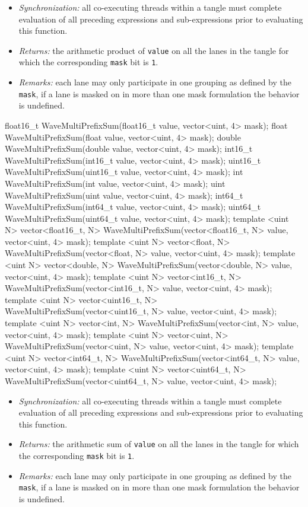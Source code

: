 \begin{itemize}
  \item \textit{Synchronization:} all co-executing threads within a \gls{tangle}
  must complete evaluation of all preceding expressions and sub-expressions
  prior to evaluating this function.
  \item \textit{Returns:} the arithmetic product of \texttt{value} on all the
  \gls{lane}s in the \gls{tangle} for which the corresponding \texttt{mask} bit
  is \texttt{1}.
  \item \textit{Remarks:} each \gls{lane} may only participate in one grouping
  as defined by the \texttt{mask}, if a \gls{lane} is masked on in more than one
  mask formulation the behavior is undefined.
\end{itemize}

\begin{HLSL}
float16_t WaveMultiPrefixSum(float16_t value, vector<uint, 4> mask);
float WaveMultiPrefixSum(float value, vector<uint, 4> mask);
double WaveMultiPrefixSum(double value, vector<uint, 4> mask);
int16_t WaveMultiPrefixSum(int16_t value, vector<uint, 4> mask);
uint16_t WaveMultiPrefixSum(uint16_t value, vector<uint, 4> mask);
int WaveMultiPrefixSum(int value, vector<uint, 4> mask);
uint WaveMultiPrefixSum(uint value, vector<uint, 4> mask);
int64_t WaveMultiPrefixSum(int64_t value, vector<uint, 4> mask);
uint64_t WaveMultiPrefixSum(uint64_t value, vector<uint, 4> mask);
template <uint N>
vector<float16_t, N> WaveMultiPrefixSum(vector<float16_t, N> value, vector<uint, 4> mask);
template <uint N>
vector<float, N> WaveMultiPrefixSum(vector<float, N> value, vector<uint, 4> mask);
template <uint N>
vector<double, N> WaveMultiPrefixSum(vector<double, N> value, vector<uint, 4> mask);
template <uint N>
vector<int16_t, N> WaveMultiPrefixSum(vector<int16_t, N> value, vector<uint, 4> mask);
template <uint N>
vector<uint16_t, N> WaveMultiPrefixSum(vector<uint16_t, N> value, vector<uint, 4> mask);
template <uint N>
vector<int, N> WaveMultiPrefixSum(vector<int, N> value, vector<uint, 4> mask);
template <uint N>
vector<uint, N> WaveMultiPrefixSum(vector<uint, N> value, vector<uint, 4> mask);
template <uint N>
vector<int64_t, N> WaveMultiPrefixSum(vector<int64_t, N> value, vector<uint, 4> mask);
template <uint N>
vector<uint64_t, N> WaveMultiPrefixSum(vector<uint64_t, N> value, vector<uint, 4> mask);
\end{HLSL}

\begin{itemize}
  \item \textit{Synchronization:} all co-executing threads within a \gls{tangle}
  must complete evaluation of all preceding expressions and sub-expressions
  prior to evaluating this function.
  \item \textit{Returns:} the arithmetic sum of \texttt{value} on all the
  \gls{lane}s in the \gls{tangle} for which the corresponding \texttt{mask} bit
  is \texttt{1}.
  \item \textit{Remarks:} each \gls{lane} may only participate in one grouping
  as defined by the \texttt{mask}, if a \gls{lane} is masked on in more than one
  mask formulation the behavior is undefined.
\end{itemize}


